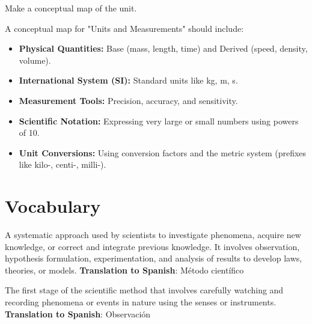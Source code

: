 \begin{exercise}
    Make a conceptual map of the unit.

    \begin{solu}
        A conceptual map for "Units and Measurements" should include:
        \begin{itemize}
            \item \textbf{Physical Quantities:} Base (mass, length, time) and Derived (speed, density, volume).
            \item \textbf{International System (SI):} Standard units like \unit{\kg}, \unit{\m}, \unit{\s}.
            \item \textbf{Measurement Tools:} Precision, accuracy, and sensitivity.
            \item \textbf{Scientific Notation:} Expressing very large or small numbers using powers of 10.
            \item \textbf{Unit Conversions:} Using conversion factors and the metric system (prefixes like kilo-, centi-, milli-).
        \end{itemize}
    \end{solu}

\end{exercise}


\section{Vocabulary}

\begin{vocabulary}
A systematic approach used by scientists to investigate phenomena, acquire new knowledge, or correct and integrate previous knowledge. It involves observation, hypothesis formulation, experimentation, and analysis of results to develop laws, theories, or models. \newline
\textbf{Translation to Spanish}: Método científico \newline
\end{vocabulary}

\begin{vocabulary}[Observation]
The first stage of the scientific method that involves carefully watching and recording phenomena or events in nature using the senses or instruments. \newline
\textbf{Translation to Spanish}: Observación \newline
\end{vocabulary}

